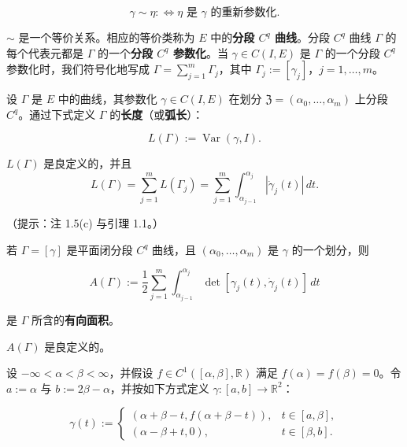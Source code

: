 \begin{exercises}
\[
\gamma \sim \eta :\Longleftrightarrow \eta \text{ 是 } \gamma \text{ 的重新参数化} .
\]

\begin{items}
\item

\proofhead
$ \sim $ 是一个等价关系。相应的等价类称为 $ E $ 中的\textbf{分段 $ C^{q} $ 曲线}。分段 $ C^{q} $ 曲线 $ \Gamma $ 的每个代表元都是 $ \Gamma $ 的一个\textbf{分段 $ C^{q} $ 参数化}。当 $ \gamma \in C(I, E) $ 是 $ \Gamma $ 的一个分段 $ C^{q} $ 参数化时，我们符号化地写成 $ \Gamma = \sum_{j=1}^{m}\Gamma_{j} $，其中 $ \Gamma_{j} := [\gamma_{j}] $，$ j = 1, \ldots, m $。
\item

设 $ \Gamma $ 是 $ E $ 中的曲线，其参数化 $ \gamma \in C(I, E) $ 在划分 $ \mathfrak{Z} = (\alpha_{0}, \ldots, \alpha_{m}) $ 上分段 $ C^{q} $。通过下式定义 $ \Gamma $ 的\textbf{长度}（或\textbf{弧长}）：

\[
L(\Gamma) := \operatorname{Var}(\gamma, I) .
\]

\proofhead
$ L(\Gamma) $ 是良定义的，并且
\[
L(\Gamma) = \sum_{j=1}^{m}L(\Gamma_{j}) = \sum_{j=1}^{m}\int_{\alpha_{j-1}}^{\alpha_{j}}\left|\dot{\gamma}_{j}(t)\right|\,dt .
\]

（提示：注 1.5(c) 与引理 1.1。）

\end{items}

\item

若 $ \Gamma = [\gamma] $ 是平面闭分段 $ C^{q} $ 曲线，且 $ (\alpha_{0}, \ldots, \alpha_{m}) $ 是 $ \gamma $ 的一个划分，则

\[
A(\Gamma) := \frac{1}{2}\sum_{j=1}^{m}\int_{\alpha_{j-1}}^{\alpha_{j}}\det\left[\gamma_{j}(t), \dot{\gamma}_{j}(t)\right]\,dt
\]

是 $ \Gamma $ 所含的\textbf{有向面积}。

\begin{items}
\item

\proofhead
$ A(\Gamma) $ 是良定义的。
\item

设 $ -\infty < \alpha < \beta < \infty $，并假设 $ f \in C^{1}([\alpha, \beta], \mathbb{R}) $ 满足 $ f(\alpha) = f(\beta) = 0 $。令 $ a := \alpha $ 与 $ b := 2\beta - \alpha $，并按如下方式定义 $ \gamma : [a, b] \to \mathbb{R}^{2} $：

\begin{equation*}
\gamma(t) := \begin{cases} (\alpha + \beta - t, f(\alpha + \beta - t)) , & t \in [a, \beta] , \\ (\alpha - \beta + t, 0) , & t \in [\beta, b] . \end{cases}
\end{equation*}


\end{items}
\end{exercises}
